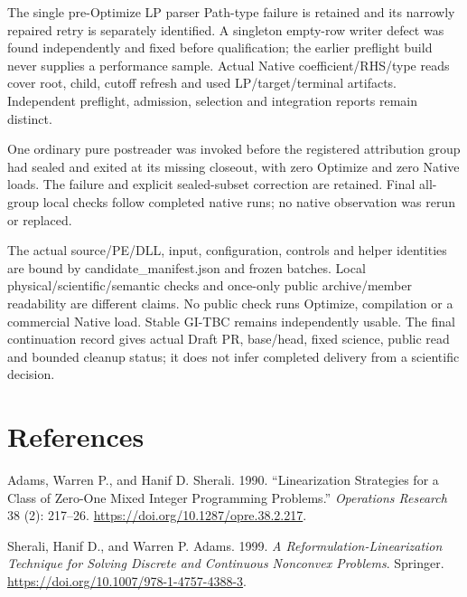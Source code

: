 \documentclass[
  american,
  11pt,
]{article}
\newlength{\cslhangindent}
\newenvironment{CSLReferences}[2] %
 {\begin{list}{}{%
  \setlength{\itemindent}{0pt}
  \setlength{\leftmargin}{0pt}
  \setlength{\parsep}{0pt}
  \ifodd #1
   \setlength{\leftmargin}{\cslhangindent}
   \setlength{\itemindent}{-1\cslhangindent}
  \fi
  \setlength{\itemsep}{#2\baselineskip}}}
 {\end{list}}
\begin{document}
The single pre-Optimize LP parser Path-type failure is retained and its
narrowly repaired retry is separately identified. A singleton empty-row
writer defect was found independently and fixed before qualification;
the earlier preflight build never supplies a performance sample. Actual
Native coefficient/RHS/type reads cover root, child, cutoff refresh and
used LP/target/terminal artifacts. Independent preflight, admission,
selection and integration reports remain distinct.

One ordinary pure postreader was invoked before the registered
attribution group had sealed and exited at its missing closeout, with
zero Optimize and zero Native loads. The failure and explicit
sealed-subset correction are retained. Final all-group local checks
follow completed native runs; no native observation was rerun or
replaced.

The actual source/PE/DLL, input, configuration, controls and helper
identities are bound by candidate\_\allowbreak{}manifest.json and frozen batches.
Local physical/scientific/semantic checks and once-only public
archive/member readability are different claims. No public check runs
Optimize, compilation or a commercial Native load. Stable GI-TBC remains
independently usable. The final continuation record gives actual Draft
PR, base/head, fixed science, public read and bounded cleanup status; it
does not infer completed delivery from a scientific decision.

\section{References}\label{references}

\protect{}\label{refs}
\begin{CSLReferences}{1}{1}
Adams, Warren P., and Hanif D. Sherali. 1990. {``Linearization
Strategies for a Class of Zero-One Mixed Integer Programming
Problems.''} \emph{Operations Research} 38 (2): 217--26.
\url{https://doi.org/10.1287/opre.38.2.217}.

Sherali, Hanif D., and Warren P. Adams. 1999. \emph{A
Reformulation-Linearization Technique for Solving Discrete and
Continuous Nonconvex Problems}. Springer.
\url{https://doi.org/10.1007/978-1-4757-4388-3}.

\end{CSLReferences}
\end{document}

